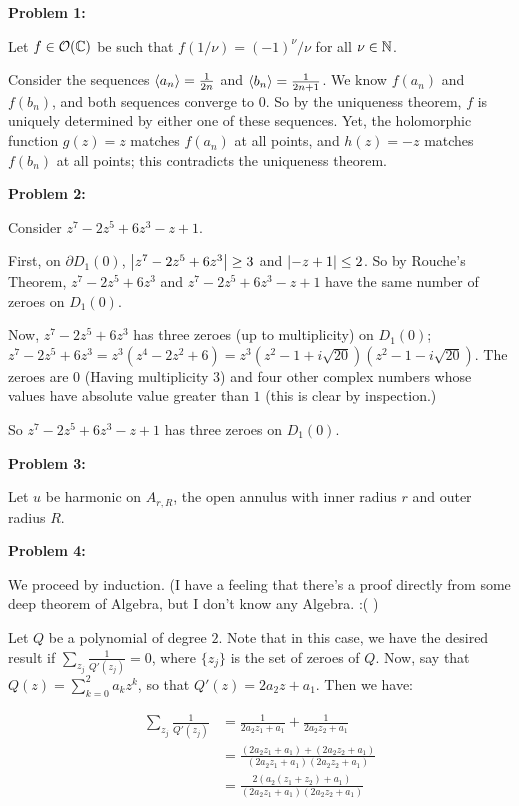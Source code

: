 \documentclass[a4paper,12pt]{article}
\begin{document}
{\bf Problem 1:}

Let $f \in \mathcal{O}(\mathbb{C})$ be such that $f(1/\nu) = (-1)^\nu/\nu$ for all $\nu \in \mathbb{N}$. 

Consider the sequences $\left\langle a_n \right\rangle = \frac{1}{2n}$ and $\left\langle b_n \right\rangle = \frac{1}{2n+1}$. We know $f(a_n)$ and $f(b_n)$, and both sequences converge to $0$. So by the uniqueness theorem, $f$ is uniquely determined by either one of these sequences. Yet, the holomorphic function $g(z) = z$ matches $f(a_n)$ at all points, and $h(z)= -z$ matches $f(b_n)$ at all points; this contradicts the uniqueness theorem.

\shunt

{\bf Problem 2:}

Consider $z^7 -2z^5+6z^3-z+1$.

First, on $\partial D_1(0)$, $\left\lvert z^7-2z^5+6z^3 \right\rvert \geq 3$ and $\left\lvert -z+1 \right\rvert \leq 2$. So by Rouche's Theorem, $z^7-2z^5+6z^3$ and $z^7 -2z^5+6z^3-z+1$ have the same number of zeroes on $D_1(0)$.

Now, $z^7-2z^5+6z^3$ has three zeroes (up to multiplicity) on $D_1(0)$; $z^7-2z^5+6z^3 = z^3(z^4-2z^2+6) = z^3(z^2-1+i\sqrt{20}) (z^2-1-i\sqrt{20})$. The zeroes are $0$ (Having multiplicity $3$) and four other complex numbers whose values have absolute value greater than $1$ (this is clear by inspection.)

So $z^7 -2z^5+6z^3-z+1$ has three zeroes on $D_1(0)$.

\shunt

{\bf Problem 3:}

Let $u$ be harmonic on $A_{r,R}$, the open annulus with inner radius $r$ and outer radius $R$.

\shunt

{\bf Problem 4:} %

We proceed by induction. (I have a feeling that there's a proof directly from some deep theorem of Algebra, but I don't know any Algebra. :( )

Let $Q$ be a polynomial of degree $2$. Note that in this case, we have the desired result if $\sum\limits_{z_j} \frac{1}{Q'(z_j)} = 0$, where $\{z_j\}$ is the set of zeroes of $Q$. Now, say that $Q(z) = \sum\limits_{k=0}^2 a_kz^k$, so that $Q'(z) = 2a_2 z + a_1$. Then we have:

\begin{align*}
\sum\limits_{z_j} \frac{1}{Q'(z_j)} &=\frac{1}{2a_2z_1+a_1} + \frac{1}{2a_2z_2+a_1}\\
&=\frac{(2a_2z_1+a_1)+(2a_2z_2+a_1)}{(2a_2z_1+a_1)(2a_2z_2+a_1)} \\
&=\frac{2(a_2(z_1+z_2) + a_1)}{(2a_2z_1+a_1)(2a_2z_2+a_1)} \\
\end{align*}
\end{document}
